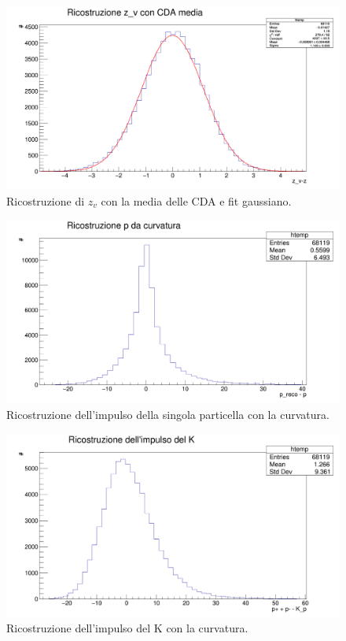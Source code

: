 \documentclass[8pt]{extarticle}
\begin{document}
\begin{figure}
	\begin{center}
		\includegraphics[scale=0.3]{reco_zCDA} 
		\caption{Ricostruzione di $z_v$ con la media delle CDA e fit gaussiano.}
		\label{fig:reco_zCDA}
	\end{center}
\end{figure}

\begin{figure}
	\begin{center}
		\includegraphics[scale=0.25]{reco_p_curvatura} 
		\caption{Ricostruzione dell'impulso della singola particella con la curvatura.}
		\label{fig:reco_p_curvatura}
	\end{center}
\end{figure}

\begin{figure}
	\begin{center}
		\includegraphics[scale=0.25]{reco_pk_curvatura} 
		\caption{Ricostruzione dell'impulso del K con la curvatura.}
		\label{fig:reco_pk_curvatura}
	\end{center}
\end{figure}
\end{document}
